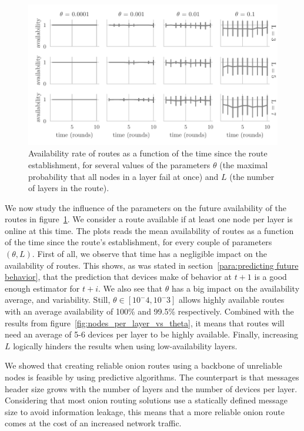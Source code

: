 \begin{figure}[t]
\includegraphics[width=\columnwidth]{figures/success_rate_vs_t.pdf}
\caption{\label{fig:success_rate_vs_t}Availability rate of routes as a function of the time since the route establishment, for several values of the parameters $\theta$ (the maximal probability that all nodes in a layer fail at once) and $L$ (the number of layers in the route).}
\end{figure}

We now study the influence of the parameters on the future availability of the routes in figure~\ref{fig:success_rate_vs_t}.
We consider a route available if at least one node per layer is online at this time.
The plots reads the mean availability of routes as a function of the time since the route's establishment, for every couple of parameters $(\theta, L)$.
First of all, we observe that time has a negligible impact on the availability of routes. 
This shows, as was stated in section~\ref{para:predicting future behavior}, that the prediction that devices make of behavior at $t+1$ is a good enough estimator for $t+i$.
We also see that $\theta$ has a big impact on the availability average, and variability.
Still, $\theta\in[10^-4, 10^-3]$ allows highly available routes with an average availability of 100\% and 99.5\% respectively.
Combined with the results from figure~\ref{fig:nodes_per_layer_vs_theta}, it means that routes will need an average of 5-6 devices per layer to be highly available.
Finally, increasing $L$ logically hinders the results when using low-availability layers.

We showed that creating reliable onion routes using a backbone of unreliable nodes is feasible by using predictive algorithms.
The counterpart is that messages header size grows  with the number of layers and the number of devices per layer.
Considering that most onion routing solutions use a statically defined message size to avoid information leakage, this means that a more reliable onion route comes at the cost of an increased network traffic.

